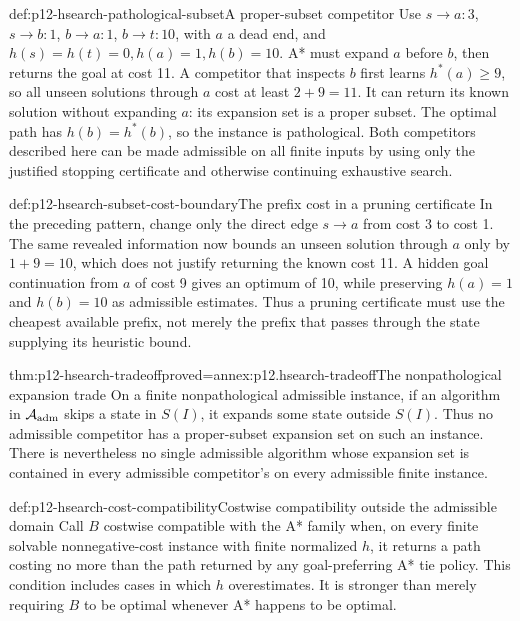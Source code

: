 \begin{hbexample}{def:p12-hsearch-pathological-subset}{A proper-subset competitor}
Use \(s\to a:3\), \(s\to b:1\), \(b\to a:1\),
\(b\to t:10\), with \(a\) a dead end, and
\(h(s)=h(t)=0,h(a)=1,h(b)=10\). A* must expand \(a\) before
\(b\), then returns the goal at cost 11. A competitor that inspects
\(b\) first learns \(h^*(a)\ge 9\), so all unseen solutions through
\(a\) cost at least \(2+9=11\). It can return its known solution
without expanding \(a\): its expansion set is a proper subset.
The optimal path has \(h(b)=h^*(b)\), so the instance is pathological.
Both competitors described here can be made admissible on all finite
inputs by using only the justified stopping certificate and otherwise
continuing exhaustive search.
\end{hbexample}

\begin{hbexample}{def:p12-hsearch-subset-cost-boundary}{The prefix cost in a pruning certificate}
In the preceding pattern, change only the direct edge \(s\to a\)
from cost 3 to cost 1. The same revealed information now bounds an
unseen solution through \(a\) only by \(1+9=10\), which does
not justify returning the known cost 11. A hidden goal continuation
from \(a\) of cost 9 gives an optimum of 10, while preserving
\(h(a)=1\) and \(h(b)=10\) as admissible estimates. Thus a
pruning certificate must use the cheapest available prefix, not merely
the prefix that passes through the state supplying its heuristic bound.
\end{hbexample}

\begin{hbtheorem}{thm:p12-hsearch-tradeoff}{proved=annex:p12.hsearch-tradeoff}{The nonpathological expansion trade}
On a finite nonpathological admissible instance, if an algorithm in
\(\mathcal A_{\rm adm}\) skips a state in \(S(I)\), it expands
some state outside \(S(I)\). Thus no admissible competitor has a
proper-subset expansion set on such an instance. There is nevertheless
no single admissible algorithm whose expansion set is contained in every
admissible competitor's on every admissible finite instance.
\end{hbtheorem}

\begin{hbdefinition}{def:p12-hsearch-cost-compatibility}{Costwise compatibility outside the admissible domain}
Call \(B\) costwise compatible with the A* family when, on every
finite solvable nonnegative-cost instance with finite normalized
\(h\), it returns a path costing no more than the path returned by
any goal-preferring A* tie policy. This condition includes cases in which
\(h\) overestimates. It is stronger than merely requiring \(B\)
to be optimal whenever A* happens to be optimal.
\end{hbdefinition}

